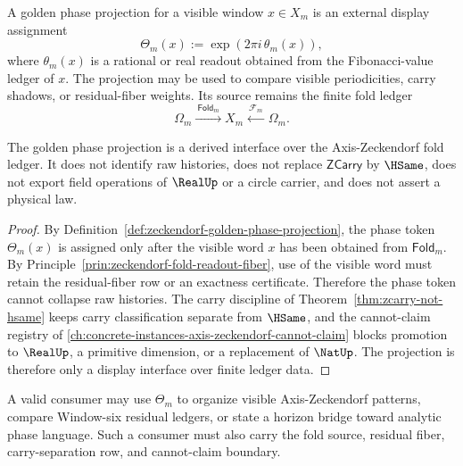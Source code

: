 \begin{definition}
\label{def:zeckendorf-golden-phase-projection}
A golden phase projection for a visible window \(x\in X_m\) is an
external display assignment
$$
  \Theta_m(x)
  :=
  \exp(2\pi i\,\theta_m(x)),
$$
where \(\theta_m(x)\) is a rational or real readout obtained from the
Fibonacci-value ledger of \(x\). The projection may be used to compare
visible periodicities, carry shadows, or residual-fiber weights. Its
source remains the finite fold ledger
$$
  \Omega_m
  \xrightarrow{\ \mathsf{Fold}_m\ }
  X_m
  \xleftarrow{\ \mathcal{F}_m\ }
  \Omega_m.
$$
\end{definition}

\begin{theorem}
\label{thm:zeckendorf-golden-phase-derived-readout}
The golden phase projection is a derived interface over the
Axis-Zeckendorf fold ledger. It does not identify raw histories, does not
replace \(\mathsf{ZCarry}\) by \(\HSame\), does not export field
operations of \(\RealUp\) or a circle carrier, and does not assert a
physical law.
\end{theorem}
\begin{proof}
By Definition~\ref{def:zeckendorf-golden-phase-projection}, the phase
token \(\Theta_m(x)\) is assigned only after the visible word \(x\) has
been obtained from \(\mathsf{Fold}_m\). By
Principle~\ref{prin:zeckendorf-fold-readout-fiber}, use of the visible
word must retain the residual-fiber row or an exactness certificate.
Therefore the phase token cannot collapse raw histories. The carry
discipline of Theorem~\ref{thm:zcarry-not-hsame} keeps carry
classification separate from \(\HSame\), and the cannot-claim registry
of \autoref{ch:concrete-instances-axis-zeckendorf-cannot-claim} blocks
promotion to \(\RealUp\), a primitive dimension, or a replacement of
\(\NatUp\). The projection is therefore only a display interface over
finite ledger data.
\end{proof}

\begin{corollary}
\label{cor:zeckendorf-golden-phase-allowed-use}
A valid consumer may use \(\Theta_m\) to organize visible
Axis-Zeckendorf patterns, compare Window-six residual ledgers, or state a
horizon bridge toward analytic phase language. Such a consumer must also
carry the fold source, residual fiber, carry-separation row, and
cannot-claim boundary.
\end{corollary}

